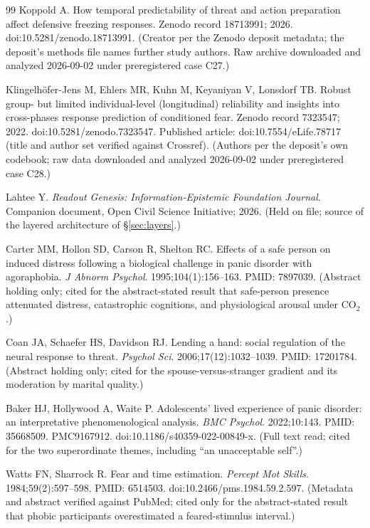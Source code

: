 \documentclass[9pt,twocolumn]{article}
\begin{document}
\begin{thebibliography}{99}
Koppold A. How temporal predictability of threat and action preparation affect defensive freezing responses. Zenodo record 18713991; 2026. doi:10.5281/zenodo.18713991. (Creator per the Zenodo deposit metadata; the deposit's methods file names further study authors. Raw archive downloaded and analyzed 2026-09-02 under preregistered case C27.)

Klingelh\"ofer-Jens M, Ehlers MR, Kuhn M, Keyaniyan V, Lonsdorf TB. Robust group- but limited individual-level (longitudinal) reliability and insights into cross-phases response prediction of conditioned fear. Zenodo record 7323547; 2022. doi:10.5281/zenodo.7323547. Published article: doi:10.7554/eLife.78717 (title and author set verified against Crossref). (Authors per the deposit's own codebook; raw data downloaded and analyzed 2026-09-02 under preregistered case C28.)

Lahtee Y. \emph{Readout Genesis: Information-Epistemic Foundation Journal}. Companion document, Open Civil Science Initiative; 2026. (Held on file; source of the layered architecture of \S\ref{sec:layers}.)

Carter MM, Hollon SD, Carson R, Shelton RC. Effects of a safe person on induced distress following a biological challenge in panic disorder with agoraphobia. \emph{J Abnorm Psychol}. 1995;104(1):156--163. PMID: 7897039. (Abstract holding only; cited for the abstract-stated result that safe-person presence attenuated distress, catastrophic cognitions, and physiological arousal under CO$_2$.)

Coan JA, Schaefer HS, Davidson RJ. Lending a hand: social regulation of the neural response to threat. \emph{Psychol Sci}. 2006;17(12):1032--1039. PMID: 17201784. (Abstract holding only; cited for the spouse-versus-stranger gradient and its moderation by marital quality.)

Baker HJ, Hollywood A, Waite P. Adolescents' lived experience of panic disorder: an interpretative phenomenological analysis. \emph{BMC Psychol}. 2022;10:143. PMID: 35668509. PMC9167912. doi:10.1186/s40359-022-00849-x. (Full text read; cited for the two superordinate themes, including ``an unacceptable self''.)

Watts FN, Sharrock R. Fear and time estimation. \emph{Percept Mot Skills}. 1984;59(2):597--598. PMID: 6514503. doi:10.2466/pms.1984.59.2.597. (Metadata and abstract verified against PubMed; cited only for the abstract-stated result that phobic participants overestimated a feared-stimulus interval.)


\end{thebibliography}
\end{document}
